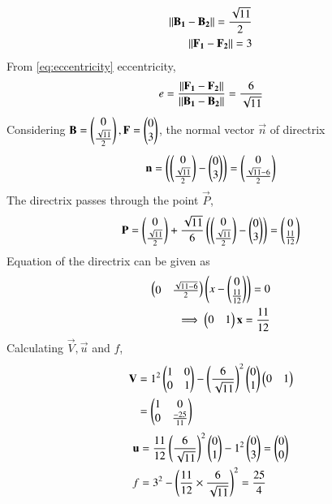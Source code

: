 \documentclass[journal,12pt,twocolumn]{IEEEtran}
\begin{document}
\begin{align}
    \lVert\mathbf{B_1}-\mathbf{B_2}\rVert = \frac{\sqrt{11}}{2}\\
    \lVert\mathbf{F_1}-\mathbf{F_2}\rVert = 3
\end{align}
From \eqref{eq:eccentricity} eccentricity,
\begin{align}
    e = \frac{\lVert\mathbf{F_1}-\mathbf{F_2}\rVert}{\lVert\mathbf{B_1}-\mathbf{B_2}\rVert} = \frac{6}{\sqrt{11}} 
\end{align}
Considering $\mathbf{B} = \begin{pmatrix}0\\\frac{\sqrt{11}}{2}\end{pmatrix}, \mathbf{F} = \begin{pmatrix}0\\3\end{pmatrix}$, the normal vector $\vec{n}$ of directrix
\begin{align}
    \mathbf{n} = \left(\begin{pmatrix}0\\\frac{\sqrt{11}}{2}\end{pmatrix}-\begin{pmatrix}0\\3\end{pmatrix}\right) =  \begin{pmatrix}0\\\frac{\sqrt{11}-6}{2}\end{pmatrix}
\end{align}
The directrix passes through the point $\vec{P}$,
\begin{align}
    \mathbf{P} = \begin{pmatrix}0\\\frac{\sqrt{11}}{2}\end{pmatrix} +\frac{\sqrt{11}}{6}\left(\begin{pmatrix}0\\\frac{\sqrt{11}}{2}\end{pmatrix}-\begin{pmatrix}0\\3\end{pmatrix}\right)= \begin{pmatrix}0\\\frac{11}{12}\end{pmatrix}
\end{align}
Equation of the directrix can be given as
\begin{align}
    \begin{pmatrix}0&\frac{\sqrt{11-6}}{2}\end{pmatrix}\left(x - \begin{pmatrix}0\\\frac{11}{12}\end{pmatrix}\right) = 0\\
    \implies \begin{pmatrix}0&1\end{pmatrix}\mathbf{x} = \frac{11}{12}
\end{align}
Calculating $\vec{V}, \vec{u}$ and $f$,
\begin{align}
    \mathbf{V} &= 1^2\begin{pmatrix}1&0\\0&1\end{pmatrix} - \left(\frac{6}{\sqrt{11}}\right)^2\begin{pmatrix}0\\1\end{pmatrix}\begin{pmatrix}0&1\end{pmatrix}\\
    &= \begin{pmatrix}1&0\\0&\frac{-25}{11}\end{pmatrix}
\end{align}
\begin{align}
     \mathbf{u} &= \frac{11}{12}\left(\frac{6}{\sqrt{11}}\right)^2\begin{pmatrix}0\\1\end{pmatrix} - 1^2\begin{pmatrix}0\\3\end{pmatrix}=\begin{pmatrix}0\\0\end{pmatrix}\\
    f &= 3^2 - \left(\frac{11}{12}\times\frac{6}{\sqrt{11}}\right)^2 = \frac{25}{4}
\end{align}
\end{document}
